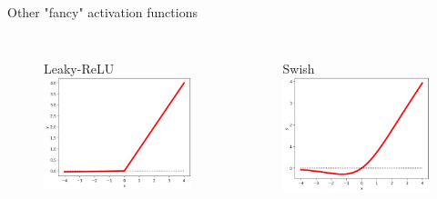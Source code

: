 \documentclass[handout, 10pt]{beamer}
\begin{document}
\begin{frame}{Other "fancy" activation functions}
\begin{columns}
    \begin{figure}
        \centering
        Leaky-ReLU\\
        \includegraphics[width=.85\textwidth]{fig/L2/activ-l-relu.png}\\
      

    \end{figure}
    \begin{figure}
     \centering
        Swish\\
        \includegraphics[width=.85\textwidth]{fig/L2/activ-swish.png}\\
     

    \end{figure}
\end{columns}
\end{frame}
\end{document}
